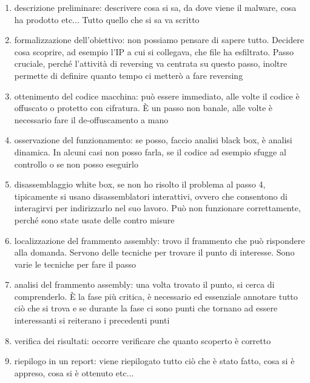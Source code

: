 \documentclass{article}
\begin{document}
\begin{enumerate}
\item descrizione preliminare: descrivere cosa si sa, da dove viene il malware, cosa ha prodotto etc... Tutto quello che si sa va scritto
\item formalizzazione dell'obiettivo: non possiamo pensare di sapere tutto. Decidere cosa scoprire, ad esempio l'IP a cui si collegava, che file ha esfiltrato. Passo cruciale, perché l'attività di reversing va centrata su questo passo, inoltre permette di definire quanto tempo ci metterò a fare reversing
\item ottenimento del codice macchina: può essere immediato, alle volte il codice è offuscato o protetto con cifratura. È un passo non banale, alle volte è necessario fare il de-offuscamento a mano
\item osservazione del funzionamento: se posso, faccio analisi black box, è analisi dinamica. In alcuni casi non posso farla, se il codice ad esempio sfugge al controllo o se non posso eseguirlo
\item disassemblaggio white box, se non ho risolto il problema al passo 4, tipicamente si usano disassemblatori interattivi, ovvero che consentono di interagirvi per indirizzarlo nel suo lavoro. Può non funzionare correttamente, perché sono state usate delle contro misure
\item localizzazione del frammento assembly: trovo il frammento che può rispondere alla domanda. Servono delle tecniche per trovare il punto di interesse. Sono varie le tecniche per fare il passo
\item analisi del frammento assembly: una volta trovato il punto, si cerca di comprenderlo. È la fase più critica, è necessario ed essenziale annotare tutto ciò che si trova e se durante la fase ci sono punti che tornano ad essere interessanti si reiterano i precedenti punti
\item verifica dei risultati: occorre verificare che quanto scoperto è corretto
\item riepilogo in un report: viene riepilogato tutto ciò che è stato fatto, cosa si è appreso, cosa si è ottenuto etc...
\end{enumerate}
\end{document}

